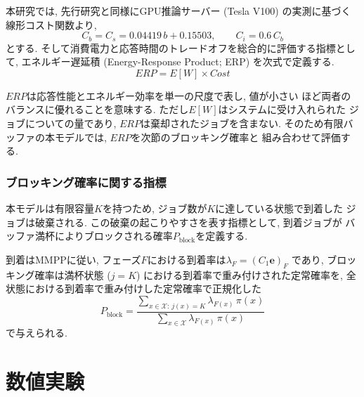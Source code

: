 \documentclass[a4paper, 11pt, dvipdfmx]{jsreport}
\begin{document}
本研究では, 先行研究\cite{LeAnh2025}と同様にGPU推論サーバー
(Tesla V100) の実測に基づく線形コスト関数より, 
\begin{equation}
    C_b = C_s = 0. 04419\, b + 0. 15503, 
    \qquad
    C_i = 0. 6\, C_b
    \label{eq:cost-function}
\end{equation}
とする. 
そして消費電力と応答時間のトレードオフを総合的に評価する指標として, 
エネルギー遅延積 (Energy-Response Product; ERP) を次式で定義する. 
\begin{equation}
    \mathit{ERP} = E[W] \times \mathit{Cost}
\end{equation}

$\mathit{ERP}$は応答性能とエネルギー効率を単一の尺度で表し, 値が小さい
ほど両者のバランスに優れることを意味する. ただし$E[W]$はシステムに受け入れられた
ジョブについての量であり, $\mathit{ERP}$は棄却されたジョブを含まない. 
そのため有限バッファの本モデルでは, $\mathit{ERP}$を次節のブロッキング確率と
組み合わせて評価する. 

\subsection{ブロッキング確率に関する指標}
\label{sec:metric-block}

本モデルは有限容量$K$を持つため, ジョブ数が$K$に達している状態で到着した
ジョブは破棄される. この破棄の起こりやすさを表す指標として, 到着ジョブが
バッファ満杯によりブロックされる確率$P_{\mathrm{block}}$を定義する. 

到着はMMPPに従い, フェーズ$F$における到着率は$\lambda_F = (C_1 \bm{e})_F$
であり, ブロッキング確率は満杯状態 ($j = K$) における到着率で重み付けされた定常確率を, 全状態における到着率で重み付けした定常確率で正規化した
\begin{equation}
    P_{\mathrm{block}}
    = \frac{\displaystyle \sum_{x \in \mathcal{X}:\, j(x) = K}
        \lambda_{F(x)}\, \pi(x)}
        {\displaystyle \sum_{x \in \mathcal{X}}
        \lambda_{F(x)}\, \pi(x)}
    \label{eq:full-prob}
\end{equation}
で与えられる. 





\chapter{数値実験}
\label{chap:numerical_results}
\end{document}
